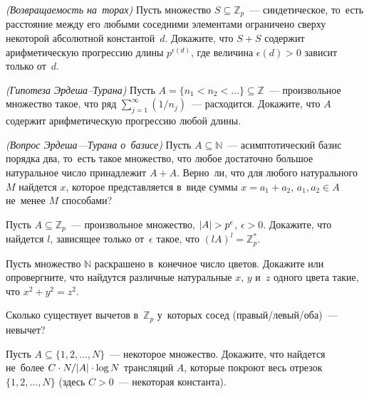\begin{problems}
\itemx{*}\emph{(Возвращаемость на~торах)}\enspace
Пусть множество $S \subseteq \mathbb{Z}_p$~--- синдетическое, то~есть
расстояние между его любыми соседними элементами ограничено сверху некоторой
абсолютной константой~$d$.
Докажите, что $S + S$ содержит арифметическую прогрессию длины
$p^{\epsilon(d)}$, где величина $\epsilon(d) > 0$ зависит только от~$d$.

\itemx{*}\emph{(Гипотеза Эрдеша--Турана)}\enspace
Пусть $A = \{ n_1 < n_2 < \ldots \} \subseteq \mathbb{Z}$~--- произвольное
множество такое, что ряд
\(
    \sum_{j=1}^\infty
        (1 / n_j)
\)~--- расходится.
Докажите, что $A$ содержит арифметическую прогрессию любой длины.

\itemx{*}\emph{(Вопрос Эрдеша---Турана о~базисе)}\enspace
Пусть $A \subseteq \mathbb{N}$~--- асимптотический базис порядка два, то~есть
такое множество, что любое достаточно большое натуральное число принадлежит
$A + A$.
Верно~ли, что для любого натурального~$M$ найдется $x$, которое представляется
в~виде суммы $x = a_1 + a_2$, $a_1, a_2 \in A$ не~менее $M$ способами?

\itemx{*}
Пусть $A \subseteq \mathbb{Z}_p$~--- произвольное множество,
$\lvert A \rvert > p^{\epsilon}$, $\epsilon > 0$.
Докажите, что найдется $l$, зависящее только от~$\epsilon$ такое, что
$(l A)^l = \mathbb{Z}^*_p$.

\itemx{*}
Пусть множество $\mathbb{N}$ раскрашено в~конечное число цветов.
Докажите или опровергните, что найдутся различные натуральные $x$, $y$ и~$z$
одного цвета такие, что $x^2 + y^2 = z^2$.

\item
Сколько существует вычетов в~$\mathbb{Z}_p$ у~которых сосед
(правый/левый/оба)~--- невычет?

\item
Пусть $A \subseteq \{ 1, 2, \ldots, N \}$~--- некоторое множество.
Докажите, что найдется не~более $C \cdot N / \lvert A \rvert \cdot \log N$ трансляций
$A$, которые покроют весь отрезок $\{ 1, 2, \ldots, N \}$
(здесь $C > 0$~--- некоторая константа).

\end{problems}

\endgroup %

